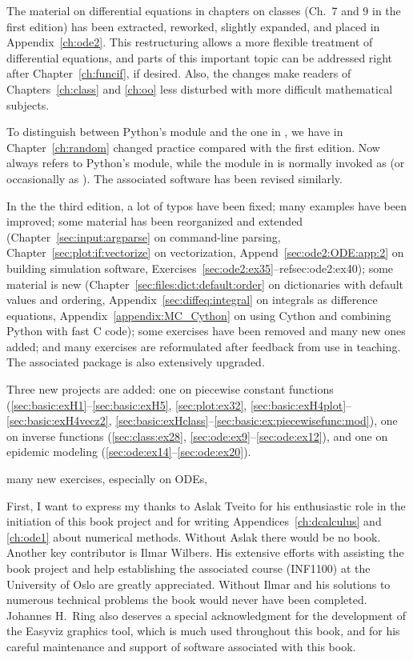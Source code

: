 The material on differential equations in chapters on classes (Ch.~7
and 9 in the first edition) has been extracted, reworked,
slightly expanded, and placed in Appendix~\ref{ch:ode2}.
This restructuring allows a
more flexible treatment of differential equations, and parts of this
important topic can be addressed right after Chapter~\ref{ch:funcif}, if
desired. Also, the changes make readers of
Chapters~\ref{ch:class} and \ref{ch:oo} less disturbed with more
difficult mathematical subjects.

To distinguish between Python's  module and the one
in , we have in Chapter~\ref{ch:random} changed practice
compared with the first edition. Now  always refers
to Python's  module, while the  module in
 is normally invoked as  (or occasionally
as ). The associated software has
been revised similarly.


In the the third edition,
a lot of typos have been fixed;
many examples have been improved;
some material has been reorganized and extended
(Chapter~\ref{sec:input:argparse} on command-line parsing,
Chapter~\ref{sec:plot:if:vectorize} on vectorization,
Append~\ref{sec:ode2:ODE:app:2} on building simulation software,
Exercises~\ref{sec:ode2:ex35}--ref{sec:ode2:ex40});
some material is new
(Chapter~\ref{sec:files:dict:default:order} on dictionaries with
default values and ordering,
Appendix~\ref{sec:diffeq:integral} on integrals as difference equations,
Appendix~\ref{appendix:MC_Cython} on using Cython and combining
Python with fast C code);
some exercises have been removed and many new ones added;
and many exercises are reformulated after feedback from
use in teaching.
The associated  package is also extensively upgraded.

Three new projects are added: one on
piecewise constant functions (\ref{sec:basic:exH1}--\ref{sec:basic:exH5},
\ref{sec:plot:ex32}, \ref{sec:basic:exH4plot}--\ref{sec:basic:exH4vecz2},
\ref{sec:basic:exHclass}--\ref{sec:basic:ex:piecewisefunc:mod}),
one on
inverse functions (\ref{sec:class:ex28}, \ref{sec:ode:ex9}--\ref{sec:ode:ex12}),
and one on epidemic modeling (\ref{sec:ode:ex14}--\ref{sec:ode:ex20}).

many new exercises, especially on ODEs,



First, I want to express my thanks
to Aslak Tveito for his enthusiastic role in the
initiation of this book project and for writing
Appendices~\ref{ch:dcalculus} and \ref{ch:ode1} about numerical
methods. Without Aslak there would be no book.  Another key
contributor is Ilmar Wilbers.  His extensive efforts with assisting
the book project and help establishing the associated course (INF1100) at the
University of Oslo are greatly appreciated. Without Ilmar and his
solutions to numerous technical problems the book would never have
been completed. Johannes H.~Ring also deserves a special
acknowledgment for the development of the Easyviz graphics tool, which
is much used throughout this book, and for his careful maintenance and
support of software associated with this book.

